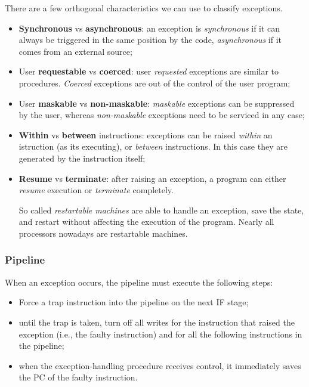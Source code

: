 \documentclass[a4paper,11pt]{article}
\begin{document}
There are a few orthogonal characteristics we can use to classify exceptions.
\begin{itemize}
	\item \textbf{Synchronous} vs \textbf{asynchronous}: an exception is \textit{synchronous} if it can always be triggered in the same position by the code, \textit{asynchronous} if it comes from an external source;
	\item User \textbf{requestable} vs \textbf{coerced}: user \textit{requested} exceptions are similar to procedures. \textit{Coerced} exceptions are out of the control of the user program;
	\item User \textbf{maskable} vs \textbf{non-maskable}: \textit{maskable} exceptions can be suppressed by the user, whereas \textit{non-maskable} exceptions need to be serviced in any case;
	\item \textbf{Within} vs \textbf{between} instructions: exceptions can be raised \textit{within} an istruction (as its executing), or \textit{between} instructions. In this case they are generated by the instruction itself;
	\item \textbf{Resume} vs \textbf{terminate}: after raising an exception, a program can either \textit{resume} execution or \textit{terminate} completely.

	      So called \textit{restartable machines} are able to handle an exception, save the state, and restart without affecting the execution of the program. Nearly all processors nowadays are restartable machines.
\end{itemize}

\subsubsection{Pipeline}

When an exception occurs, the pipeline must execute
the following steps:
\begin{itemize}
	\item Force a trap instruction into the pipeline on the next IF stage;
	\item until the trap is taken, turn off all writes for the instruction that raised the exception (i.e., the faulty instruction) and for all the following instructions in the pipeline;
	\item when the exception-handling procedure receives control, it immediately saves the PC of the faulty instruction.
\end{itemize}
\end{document}

